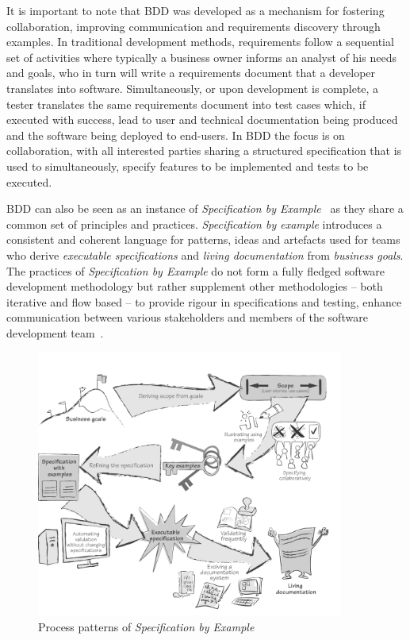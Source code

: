 \documentclass[dissertation,final]{softeng}
\begin{document}
It is important to note that BDD was developed as a mechanism for fostering collaboration, improving communication and requirements discovery through examples. In traditional development methods, requirements follow a sequential set of activities where typically a business owner informs an analyst of his needs and goals, who in turn will write a requirements document that a developer translates into software. Simultaneously, or upon development is complete, a tester translates the same requirements document into test cases which, if executed with success, lead to user and technical documentation being produced and the software being deployed to end-users. In BDD the focus is on collaboration, with all interested parties sharing a structured specification that is used to simultaneously, specify features to be implemented and tests to be executed.

BDD can also be seen as an instance of \emph{Specification by Example}~\citep{Adzic201106} as they share a common set of principles and practices. \emph{Specification by example} introduces a consistent and coherent language for patterns, ideas and artefacts used for teams who derive \emph{executable specifications} and \emph{living documentation} from \emph{business goals}. The practices of \emph{Specification by Example} do not form a fully fledged software development methodology but rather supplement other methodologies -- both iterative and flow based -- to provide rigour in specifications and testing, enhance communication between various stakeholders and members of the software development team~\citep{Adzic201106}.

\begin{figure}[h]
\includegraphics[width=0.9\textwidth]{SpecificationbyExample}
\centering
\caption[Specification by Example]{Process patterns of \emph{Specification by Example}~\citep{Adzic201106}}
\label{fig:specification_by_example}
\end{figure}
\end{document}
